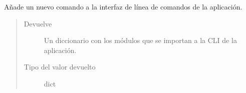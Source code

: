
\begin{fulllineitems}
\label{\detokenize{chapter_two/desc_cloudnao:manage.make_shell_context}}
Añade un nuevo comando a la interfaz de línea de comandos
de la aplicación.
\begin{quote}\begin{description}
\item[{Devuelve}] \leavevmode
Un diccionario con los módulos que se importan a la CLI de la aplicación.

\item[{Tipo del valor devuelto}] \leavevmode
dict

\end{description}\end{quote}

\end{fulllineitems}

